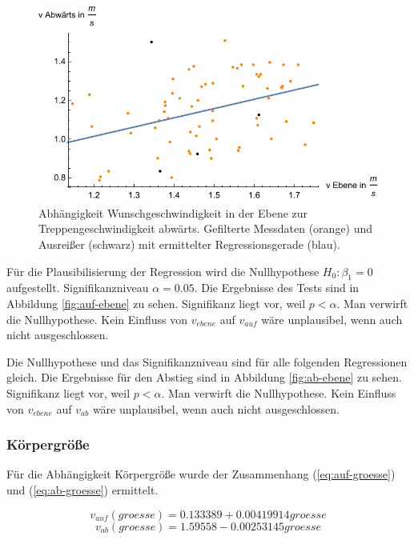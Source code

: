 \begin{figure} \centering 
	\includegraphics[]{abbildungen/regression/2017/ohneausreisser/ab-ebene.pdf}
	
	\caption{Abhängigkeit Wunschgeschwindigkeit in der Ebene zur Treppengeschwindigkeit abwärts. Gefilterte Messdaten (orange) und Ausreißer (schwarz) mit ermittelter Regressionsgerade (blau).
	\label{fig:ohne-ab-ebene}}
\end{figure}

Für die Plausibilisierung der Regression wird die Nullhypothese 
$H_0: \beta_1 = 0$ aufgestellt. Signifikanzniveau $\alpha = 0.05$.
Die Ergebnisse des Tests sind in Abbildung \ref{fig:auf-ebene} zu sehen.
Signifikanz liegt vor, weil $p < \alpha$. Man verwirft die
Nullhypothese. Kein Einfluss von $v_{ebene}$ auf $v_{auf}$ wäre unplausibel, wenn auch nicht ausgeschlossen.

Die Nullhypothese und das Signifikanzniveau sind für alle folgenden Regressionen gleich. Die Ergebnisse für den Abstieg sind in Abbildung \ref{fig:ab-ebene} zu sehen.
Signifikanz liegt vor, weil $p < \alpha$. Man verwirft die
Nullhypothese. Kein Einfluss von $v_{ebene}$ auf $v_{ab}$ wäre unplausibel, wenn auch nicht ausgeschlossen.

\subsubsection{Körpergröße}

Für die Abhängigkeit Körpergröße wurde 
der Zusammenhang (\ref{eq:auf-groesse}) und (\ref{eq:ab-groesse}) ermittelt.

\begin{equation} \label{eq:auf-groesse}
	v_{auf}(groesse) = 0.133389 + 0.00419914 groesse
\end{equation}
\begin{equation} \label{eq:ab-groesse}
	v_{ab}(groesse) = 1.59558 - 0.00253145 groesse
\end{equation}

